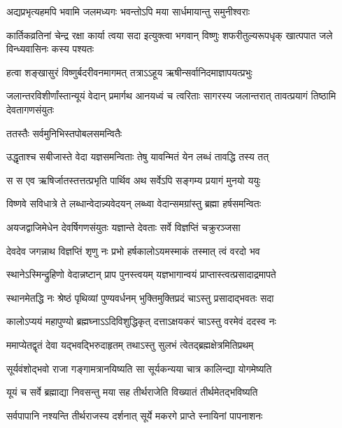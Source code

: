 \twolineshloka
{अद्यप्रभृत्यहमपि भवामि जलमध्यगः}
{भवन्तोऽपि मया सार्धमायान्तु समुनीश्वराः} %

\threelineshloka
{कार्तिकव्रतिनां चेन्द्र रक्षा कार्या त्वया सदा}
{इत्युक्त्वा भगवान् विष्णुः शफरीतुल्यरूपधृक्}
{खात्पपात जले विन्ध्यवासिनः कस्य पश्यतः} %

\twolineshloka
{हत्वा शङ्खासुरं विष्णुर्बदरीवनमागमत्}
{तत्राऽऽहूय ऋषीन्सर्वानिदमाज्ञापयत्प्रभुः} %


\threelineshloka
{जलान्तरविशीर्णांस्तान्यूयं वेदान् प्रमार्गथ}
{आनयध्वं च त्वरिताः सागरस्य जलान्तरात्}
{तावत्प्रयागं तिष्ठामि देवतागणसंयुतः} %



\onelineshloka
{ततस्तैः सर्वमुनिभिस्तपोबलसमन्वितैः} %

\twolineshloka
{उद्धृताश्च सबीजास्ते वेदा यज्ञसमन्विताः}
{तेषु यावन्मितं येन लब्धं तावद्धि तस्य तत्} %

\twolineshloka
{स स एव ऋषिर्जातस्तत्तत्प्रभृति पार्थिव}
{अथ सर्वेऽपि सङ्गम्य प्रयागं मुनयो ययुः} %

\twolineshloka
{विष्णवे सविधात्रे ते लब्धान्वेदान्न्यवेदयन्}
{लब्ध्वा वेदान्समग्रांस्तु ब्रह्मा हर्षसमन्वितः} %

\twolineshloka
{अयजद्वाजिमेधेन देवर्षिगणसंयुतः}
{यज्ञान्ते देवताः सर्वे विज्ञप्तिं चक्रुरञ्जसा} %


\twolineshloka
{देवदेव जगन्नाथ विज्ञप्तिं शृणु नः प्रभो}
{हर्षकालोऽयमस्माकं तस्मात् त्वं वरदो भव} %

\twolineshloka
{स्थानेऽस्मिन्द्रुहिणो वेदान्नष्टान् प्राप पुनस्त्वयम्}
{यज्ञभागान्वयं प्राप्तास्त्वत्प्रसादाद्रमापते} %

\twolineshloka
{स्थानमेतद्धि नः श्रेष्ठं पृथिव्यां पुण्यवर्धनम्}
{भुक्तिमुक्तिप्रदं चाऽस्तु प्रसादाद्भवतः सदा} %

\twolineshloka
{कालोऽप्ययं महापुण्यो ब्रह्मघ्नाऽऽदिविशुद्धिकृत्}
{दत्ताऽक्षयकरं चाऽस्तु वरमेवं ददस्व नः} %


\twolineshloka
{ममाप्येतद्वृतं देवा यद्भवद्भिरुदाहृतम्}
{तथाऽस्तु सुलभं त्वेतद्ब्रह्मक्षेत्रमितिप्रथम्} %

\twolineshloka
{सूर्यवंशोद्भवो राजा गङ्गामत्रानयिष्यति}
{सा सूर्यकन्यया चात्र कालिन्द्या योगमेष्यति} %

\twolineshloka
{यूयं च सर्वे ब्रह्माद्या निवसन्तु मया सह}
{तीर्थराजेति विख्यातं तीर्थमेतद्भविष्यति} %

\twolineshloka
{सर्वपापानि नश्यन्ति तीर्थराजस्य दर्शनात्}
{सूर्ये मकरगे प्राप्ते स्नायिनां पापनाशनः} %

